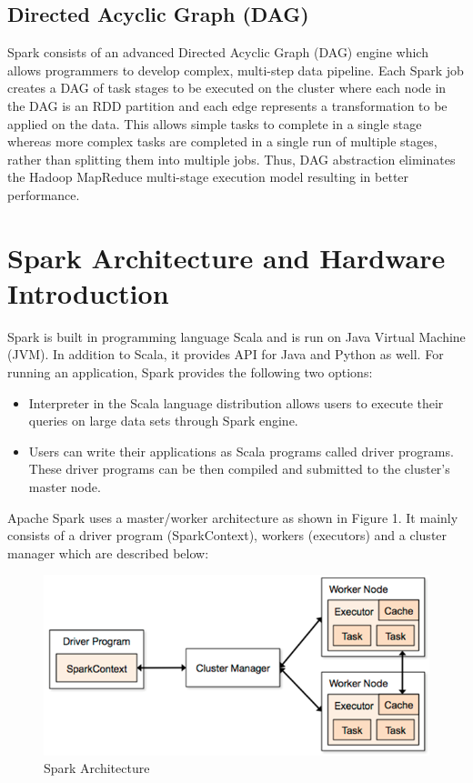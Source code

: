 \documentclass[sigconf]{acmart}
\begin{document}
\subsection{Directed Acyclic Graph (DAG)} 
Spark consists of an advanced Directed Acyclic Graph (DAG) engine which allows programmers to develop complex, multi-step data pipeline\cite{spark-a1}. Each Spark job creates a DAG of task stages to be executed on the cluster where each node in the DAG is an RDD partition and each edge represents a transformation to be applied on the data. This allows simple tasks to complete in a single stage whereas more complex tasks are completed in a single run of multiple stages, rather than splitting them into multiple jobs\cite{verma2016big-p3}. Thus, DAG abstraction eliminates the Hadoop MapReduce multi-stage execution model resulting in better performance\cite{spark-a2}.

\section{Spark Architecture and Hardware Introduction}
Spark is built in programming language Scala and is run on Java Virtual Machine (JVM). In addition to Scala, it provides API for Java and Python as well. For running an application, Spark provides the following two options\cite{verma2016big-p3}:
\begin{itemize}
	\item Interpreter in the Scala language distribution allows users to execute their queries on large data sets through Spark engine. 
	\item Users can write their applications as Scala programs called driver programs. These driver programs can be then compiled and submitted to the cluster's master node.
\end{itemize}

Apache Spark uses a master/worker architecture as shown in Figure 1. It mainly consists of a driver program (SparkContext), workers (executors) and a cluster manager which are described below\cite{spark-a2}: 

\begin{figure}
\includegraphics{images/spark-architecture}
\caption{Spark Architecture\cite{img-arch}}
\label{Figure 1}
\end{figure}
\end{document}
